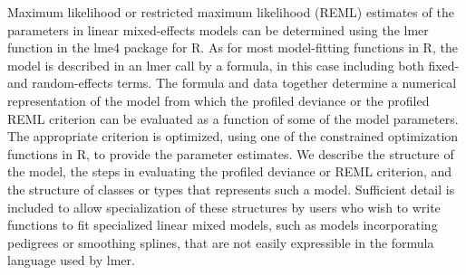 Maximum likelihood or restricted maximum likelihood (REML) estimates of the parameters in linear mixed-effects models can be determined using the lmer function in the lme4 package for R. As for most model-fitting functions in R, the model is described in an lmer call by a formula, in this case including both fixed- and random-effects terms. The formula and data together determine a numerical representation of the model from which the profiled deviance or the profiled REML criterion can be evaluated as a function of some of the model parameters. The appropriate criterion is optimized, using one of the constrained optimization functions in R, to provide the parameter estimates. We describe the structure of the model, the steps in evaluating the profiled deviance or REML criterion, and the structure of classes or types that represents such a model. Sufficient detail is included to allow specialization of these structures by users who wish to write functions to fit specialized linear mixed models, such as models incorporating pedigrees or smoothing splines, that are not easily expressible in the formula language used by lmer.
